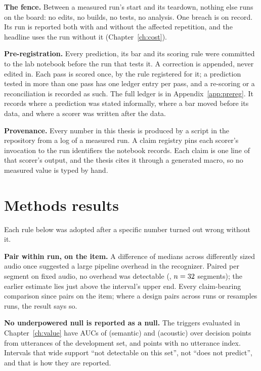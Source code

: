 \textbf{The fence.} Between a measured run's start and its teardown, nothing
else runs on the board: no edits, no builds, no tests, no analysis. One breach
is on record. Its run is reported both with and without the affected
repetition, and the headline uses the run without it
(Chapter~\ref{ch:cost}).

\textbf{Pre-registration.} Every prediction, its bar and its scoring rule were
committed to the lab notebook before the run that tests it. A correction is
appended, never edited in. Each pass is scored once, by the rule registered
for it; a prediction tested in more than one pass has one ledger entry per
pass, and a re-scoring or a reconciliation is recorded as such. The full ledger
is in Appendix~\ref{app:prereg}. It records where a prediction was stated
informally, where a bar moved before its data, and where a scorer was written
after the data.

\textbf{Provenance.} Every number in this thesis is produced by a script in
the repository from a log of a measured run. A claim registry pins each
scorer's invocation to the run identifiers the notebook records. Each claim is
one line of that scorer's output, and the thesis cites it through a generated
macro, so no measured value is typed by hand.

\section{Methods results}
\label{sec:methods-results}

Each rule below was adopted after a specific number turned out wrong without
it.

\textbf{Pair within run, on the item.} A difference of medians across
differently sized audio once suggested a large pipeline overhead in the
recognizer. Paired per segment on fixed audio, no overhead was detectable
(\AttrPaired, $n=32$ segments); the earlier estimate lies just above the
interval's upper end. Every claim-bearing comparison since pairs on the
item; where a design pairs across runs or resamples runs, the result says so.

\textbf{No underpowered null is reported as a null.} The triggers evaluated
in Chapter~\ref{ch:value} have AUCs of \TsemAUC{} (semantic) and \EpaAUC{}
(acoustic) over \TriggerPoints{} decision points from \TriggerUtts{} utterances
of the development set, and \TriggerUnindexed{} points with no utterance index.
Intervals that wide support ``not detectable on this set'', not
``does not predict'', and that is how they are reported.


